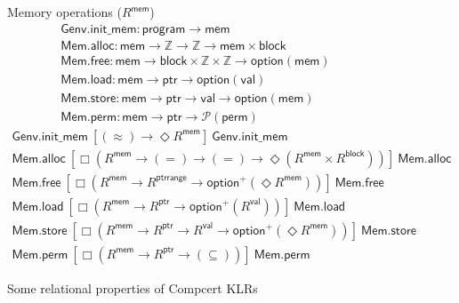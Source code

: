 \documentclass[acmsmall,anonymous]{acmart}
\newcommand{\kw}[1]{\ensuremath{ \textsf{#1} }}
\newcommand{\ifr}[1]{\ [{#1}]\ }
\begin{document}
\begin{figure}
  \vspace{2em}
  Memory operations ($R^\kw{mem}$)
  \vspace{1em}
  \[
    \begin{array}{c}
      \kw{Genv.init\_mem} :
        \kw{program} \rightarrow \kw{mem}
      \\
      \kw{Mem.alloc} :
        \kw{mem} \rightarrow \mathbb{Z} \rightarrow \mathbb{Z} \rightarrow
        \kw{mem} \times \kw{block}
      \\
      \kw{Mem.free} :
        \kw{mem} \rightarrow
        \kw{block} \times \mathbb{Z} \times \mathbb{Z} \rightarrow
        \kw{option}(\kw{mem})
      \\
      \kw{Mem.load} :
        \kw{mem} \rightarrow \kw{ptr} \rightarrow \kw{option}(\kw{val})
      \\
      \kw{Mem.store} :
        \kw{mem} \rightarrow \kw{ptr} \rightarrow \kw{val} \rightarrow \kw{option}(\kw{mem})
      \\
      \kw{Mem.perm} :
        \kw{mem} \rightarrow \kw{ptr} \rightarrow \mathcal{P}(\kw{perm})
    \end{array}
  \]
  \vspace{0.5em}
  \[
    \begin{array}{c}
      \kw{Genv.init\_mem}
      \ifr{(\approx) \rightarrow \Diamond R^\kw{mem}}
      \kw{Genv.init\_mem}
      \\
      \kw{Mem.alloc}
      \ifr{\Box(R^\kw{mem} \rightarrow (=) \rightarrow (=) \rightarrow
        \Diamond (R^\kw{mem} \times R^\kw{block}))}
      \kw{Mem.alloc}
      \\
      \kw{Mem.free}
      \ifr{\Box(R^\kw{mem} \rightarrow R^\kw{ptrrange} \rightarrow
        \kw{option}^+(\Diamond R^\kw{mem}))}
      \kw{Mem.free}
      \\
      \kw{Mem.load}
      \ifr{\Box(R^\kw{mem} \rightarrow R^\kw{ptr} \rightarrow
        \kw{option}^+(R^\kw{val}))}
      \kw{Mem.load}
      \\
      \kw{Mem.store}
      \ifr{\Box(R^\kw{mem} \rightarrow R^\kw{ptr} \rightarrow R^\kw{val} \rightarrow
        \kw{option}^+(\Diamond R^\kw{mem}))}
      \kw{Mem.store}
      \\
      \kw{Mem.perm}
      \ifr{\Box(R^\kw{mem} \rightarrow R^\kw{ptr} \rightarrow (\subseteq))}
      \kw{Mem.perm}
    \end{array}
  \]
  \caption{Some relational properties of Compcert KLRs}
  \label{fig:cklr}
\end{figure}
\end{document}
